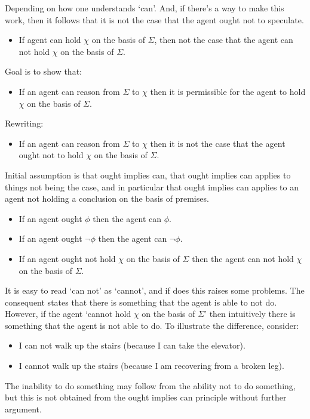 \documentclass[10pt]{article}
\begin{document}
Depending on how one understands `can'.
And, if there's a way to make this work, then it follows that it is not the case that the agent ought not to speculate.

\begin{itemize}
\item If agent can hold \(\chi\) on the basis of \(\Sigma\), then not the case that the agent can not hold \(\chi\) on the basis of \(\Sigma\).
\end{itemize}

\newpage

Goal is to show that:
\begin{itemize}
\item If an agent can reason from \(\Sigma\) to \(\chi\) then it is permissible for the agent to hold \(\chi\) on the basis of \(\Sigma\).
\end{itemize}
Rewriting:
\begin{itemize}
\item If an agent can reason from \(\Sigma\) to \(\chi\) then it is not the case that the agent ought not to hold \(\chi\) on the basis of \(\Sigma\).
\end{itemize}

Initial assumption is that ought implies can, that ought implies can applies to things not being the case, and in particular that ought implies can applies to an agent not holding a conclusion on the basis of premises.

\begin{itemize}
\item If an agent ought \(\phi\) then the agent can \(\phi\).
\item If an agent ought \(\lnot\phi\) then the agent can \(\lnot\phi\).
\item If an agent ought not hold \(\chi\) on the basis of \(\Sigma\) then the agent can not hold \(\chi\) on the basis of \(\Sigma\).
\end{itemize}

It is easy to read `can not' as `cannot', and if does this raises some problems.
The consequent states that there is something that the agent is able to not do.
However, if the agent `cannot hold \(\chi\) on the basis of \(\Sigma\)' then intuitively there is something that the agent is not able to do.
To illustrate the difference, consider:
\begin{itemize}
\item I can not walk up the stairs (because I can take the elevator).
\item I cannot walk up the stairs (because I am recovering from a broken leg).
\end{itemize}
The inability to do something may follow from the ability not to do something, but this is not obtained from the ought implies can principle without further argument.
\end{document}
